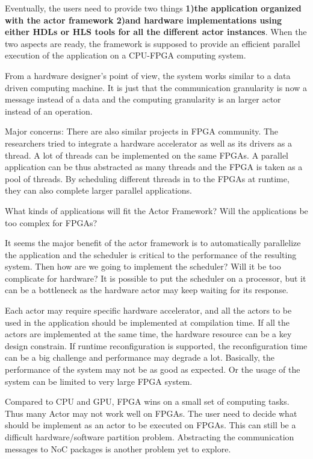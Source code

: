 Eventually, the users need to provide two things 
\textbf{1)the application organized with the actor framework 
2)and hardware implementations using either HDLs or HLS tools for
all the different actor instances}.
When the two aspects are ready, the
framework is supposed to provide an efficient parallel execution of the application on a CPU-FPGA
computing system.

From a hardware designer's point of view, the system works similar to a data driven computing
machine. It is just that the communication granularity is now a message instead of a data and the
computing granularity is an larger actor instead of an operation.

Major concerns:
There are also similar projects in FPGA community. The researchers tried to integrate a hardware
accelerator as well as its drivers as a thread. A lot of threads can be implemented on the same
FPGAs. A parallel application can be thus abstracted as many threads and the FPGA is taken as a 
pool of threads. By scheduling different threads in to the FPGAs at runtime, they can also complete 
larger parallel applications. 

What kinds of applications will fit the Actor Framework? Will the applications be too complex for FPGAs?

It seems the major benefit of the actor framework is to automatically parallelize the application 
and the scheduler is critical to the performance of the resulting system. 
Then how are we going to implement the scheduler? Will it be too complicate for hardware?
It is possible to put the scheduler on a processor, but it can be a
bottleneck as the hardware actor may keep waiting for its response.

Each actor may require specific hardware accelerator, and all 
the actors to be used in the application should be implemented 
at compilation time. If all the actors are implemented at the same time, the hardware resource can
be a key design constrain. If runtime reconfiguration is supported, the reconfiguration time can
be a big challenge and performance may degrade a lot. Basically, the performance of the system 
may not be as good as expected. Or the usage of the system can be limited to very large FPGA system.

Compared to CPU and GPU, FPGA wins on a small set of computing tasks. Thus many Actor may not work
well on FPGAs. The user need to decide what should be implement as an actor to be executed on FPGAs.
This can still be a difficult hardware/software partition problem.
Abstracting the communication messages to NoC packages is another problem yet to explore.


